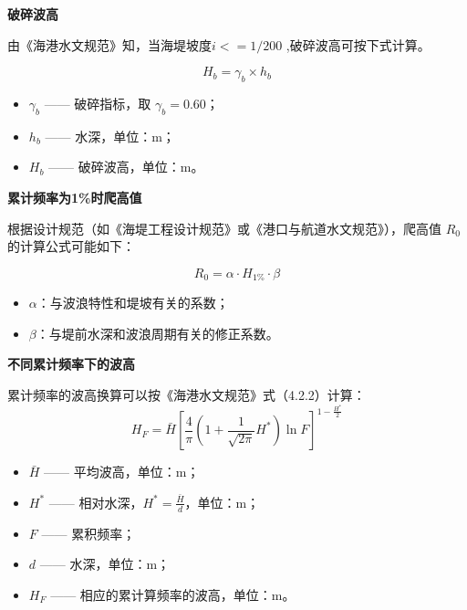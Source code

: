 \documentclass[UTF8, a4paper, 12pt]{ctexart} %
\begin{document}
\par

\par
\textbf{破碎波高}
\par
由《海港水文规范》知，当海堤坡度$i <= 1/200$ ,破碎波高可按下式计算。

\begin{equation}
    H_b = \gamma_b \times h_b
\end{equation}

\begin{itemize}
    \item $\gamma_b$ —— 破碎指标，取 $\gamma_b = 0.60$；
    \item $h_b$ —— 水深，单位：$\text{m}$；
    \item $H_b$ —— 破碎波高，单位：$\text{m}$。
\end{itemize}

\par
\textbf{累计频率为1\%时爬高值}

\par

根据设计规范（如《海堤工程设计规范》或《港口与航道水文规范》），爬高值 $R_0$ 的计算公式可能如下：

\begin{equation}
    R_0 = \alpha \cdot H_{1\%} \cdot \beta
\end{equation}

\begin{itemize}
    \item $\alpha$：与波浪特性和堤坡有关的系数；
    \item $\beta$：与堤前水深和波浪周期有关的修正系数。
\end{itemize}



\par
\textbf{不同累计频率下的波高}
\par

累计频率的波高换算可以按《海港水文规范》式（4.2.2）计算：
\begin{equation}
    H_F = \bar{H} \left[ 
    \frac{4}{\pi} \left( 1 + \frac{1}{\sqrt{2\pi}} H^* \right) \ln F 
    \right]^{1 - \frac{H^*}{2}}
\end{equation}

\begin{itemize}
    \item $\bar{H}$ —— 平均波高，单位：$\text{m}$；
    \item $H^*$ —— 相对水深，$H^* = \frac{\bar{H}}{d}$，单位：$\text{m}$；
    \item $F$ —— 累积频率；
    \item $d$ —— 水深，单位：$\text{m}$；
    \item $H_F$ —— 相应的累计算频率的波高，单位：$\text{m}$。
\end{itemize}
\end{document}
